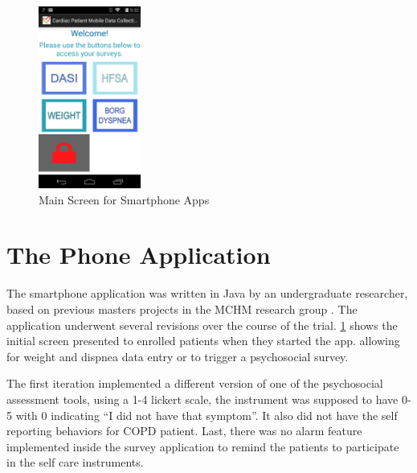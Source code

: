 \begin{figure}
 \begin{center}
  \includegraphics[scale=1,width=0.3\textwidth]{Images/AndroidSplash.png} 
  \caption{Main Screen for Smartphone Apps} 
  \label{fig:AndroidSplash}
 \end{center}
\end{figure}

\section{The Phone Application}

The smartphone application was written in Java by an undergraduate researcher, based on previous masters projects in the MCHM research group \cite{Louro2013,Putin2011}. The application underwent several revisions over the course of the trial. \cref{fig:AndroidSplash} shows the initial screen presented to enrolled patients when they started the app. allowing for weight and dispnea data entry or to trigger a psychosocial survey.

The first iteration implemented a different version of one of the psychosocial assessment tools, using a 1-4 lickert scale, the instrument was supposed to have 0-5 with 0 indicating ``I did not have that symptom''. It also did not have the self reporting behaviors for COPD patient. Last, there was no alarm feature implemented inside the survey application to remind the patients to participate in the self care instruments.

